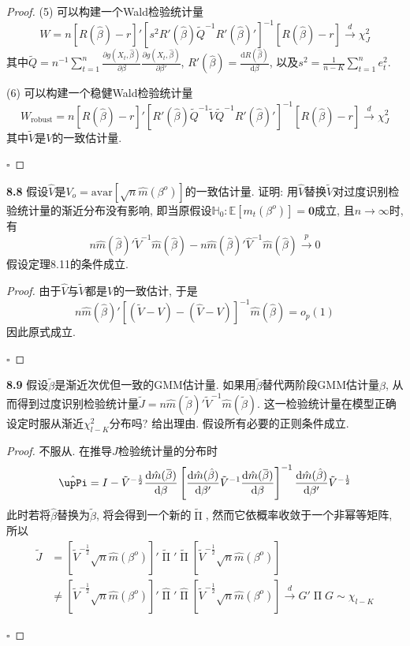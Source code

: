 \documentclass[cn,12pt,math=mtpro2,citestyle=gb7714-2015,bibstyle=gb7714-2015,twocol,mode=simple]{elegantbook}
\newcommand{\overbar}[1]{\mkern 1.5mu\overline{\mkern-1.5mu#1\mkern-1.5mu}\mkern 1.5mu}
\newcommand{\HH}{\mathbb{H}}
\newcommand{\E}{\mathbb{E}}
\newcommand{\hbeta}{\hat{\beta}}
\newcommand{\hatm}{\hat{m}}
\newcommand{\dd}{\text{d}}
\begin{document}
\begin{proof}
    (5) 可以构建一个Wald检验统计量
    $$W=n[R(\hbeta)-r]'\left[s^2R'(\hbeta)\tilde{Q}^{-1}R'(\hbeta)'\right]^{-1}[R(\hbeta)-r]\xrightarrow{d}\chi_J^2$$
    其中$\tilde{Q}=\displaystyle n^{-1}\sum_{t=1}^{n}\frac{\partial g(X_t,\hbeta)}{\partial\beta}\frac{\partial g(X_t,\hbeta)}{\partial\beta'}$, $\displaystyle R'(\hbeta)=\frac{\dd R(\hbeta)}{\dd\beta}$, 以及$\displaystyle s^2=\frac{1}{n-K}\sum_{t=1}^{n} e_t^2$.

    (6) 可以构建一个稳健Wald检验统计量
    $$W_{\text{robust}}=n[R(\hbeta)-r]'\left[R'(\hat{\beta})\tilde{Q}^{-1}\tilde{V}\tilde{Q}^{-1}R'(\hbeta)'\right]^{-1}[R(\hbeta)-r]\xrightarrow{d}\chi_J^2$$
    其中$\tilde{V}$是$V$的一致估计量.

    $\square$
  \end{proof}

  \textbf{8.8} 假设$\hat{V}$是$V_o=\text{avar}[\sqrt{n}\hatm(\beta^o)]$的一致估计量. 证明: 用$\hat{V}$替换$\tilde{V}$对过度识别检验统计量的渐近分布没有影响, 即当原假设$\HH_0: \E[m_t(\beta^o)]=\mathbf{0}$成立, 且$n\to\infty$时, 有
  $$n\hatm(\hbeta)'\tilde{V}^{-1}\hatm(\hbeta)-n\hatm(\hbeta)'\hat{V}^{-1}\hatm(\hbeta)\xrightarrow{p}0$$
  假设定理8.11的条件成立.
  \begin{proof}
    由于$\hat{V}$与$\tilde{V}$都是$V$的一致估计, 于是
    $$n\hatm(\hbeta)'[(\tilde{V}-V)-(\hat{V}-V)]^{-1}\hatm(\hbeta)=o_p(1)$$
    因此原式成立.

    $\square$
  \end{proof}

\textbf{8.9} 假设$\tilde{\beta}$是渐近次优但一致的GMM估计量. 如果用$\tilde{\beta}$替代两阶段GMM估计量$\hat{\beta}$, 从而得到过度识别检验统计量$\tilde{J}=n\hatm(\tilde{\beta})'\tilde{V}^{-1}\hatm(\tilde{\beta})$. 这一检验统计量在模型正确设定时服从渐近$\chi_{l-K}^2$分布吗? 给出理由. 假设所有必要的正则条件成立.

\begin{proof}
  不服从. 在推导$J$检验统计量的分布时
  $$\hat{\upPi}=I-\tilde{V}^{-\frac{1}{2}}\frac{\dd \hatm(\overbar{\beta})}{\dd\beta}\left[\frac{\dd\hatm(\hat{\beta})}{\dd\beta'}\tilde{V}^{-1}\frac{\dd \hatm(\overbar{\beta})}{\dd\beta}\right]^{-1}\frac{\dd\hatm(\hbeta)}{\dd\beta'}\tilde{V}^{-\frac{1}{2}}$$
  此时若将$\hat{\beta}$替换为$\tilde{\beta}$, 将会得到一个新的$\tilde{\upPi}$, 然而它依概率收敛于一个非幂等矩阵, 所以
  \begin{align*}
  \tilde{J}&=[\tilde{V}^{-\frac{1}{2}}\sqrt{n}\hat{m}(\beta^o)]'\tilde{\upPi}'\tilde{\upPi}[\tilde{V}^{-\frac{1}{2}}\sqrt{n}\hat{m}(\beta^o)] \\
  &\neq [\tilde{V}^{-\frac{1}{2}}\sqrt{n}\hat{m}(\beta^o)]'\hat{\upPi}'\hat{\upPi}[\tilde{V}^{-\frac{1}{2}}\sqrt{n}\hat{m}(\beta^o)]\xrightarrow{d}G'\upPi G\sim\chi_{l-K}
  \end{align*}

  $\square$
\end{proof}
\end{document}
